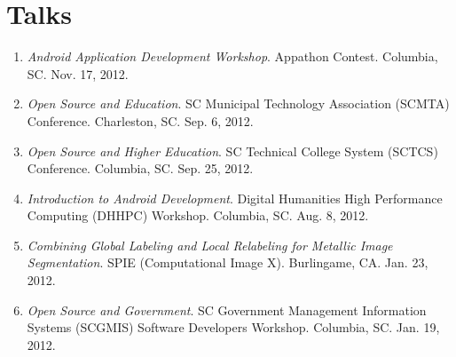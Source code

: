 \documentclass[10pt]{article}
\begin{document}
\nocite{waggoner:13c}
\nocite{waggoner:11}
\nocite{wang:11}
\nocite{temlyakov:10}
\nocite{zhang:10}
\nocite{waggoner:12}
\nocite{barbu:12}
\nocite{zhang:12}

\renewcommand\refname{Selected Publications}
{\footnotesize }


\section{Talks}
{\small
\begin{enumerate}
\renewcommand{\labelenumi}{[P\arabic{enumi}] }
\item \emph{Android Application Development Workshop}.  Appathon
  Contest.  Columbia, SC.  Nov. 17, 2012.
\item \emph{Open Source and Education}. SC Municipal Technology
  Association (SCMTA) Conference. Charleston, SC.  Sep. 6, 2012.
\item \emph{Open Source and Higher Education}.  SC Technical College
  System (SCTCS) Conference.  Columbia, SC.  Sep. 25, 2012.
\item \emph{Introduction to Android Development}.  Digital Humanities
  High Performance Computing (DHHPC) Workshop.  Columbia, SC.  Aug.
  8, 2012.
\item \emph{Combining Global Labeling and Local Relabeling for
  Metallic Image Segmentation}.  SPIE (Computational Image X).
  Burlingame, CA.  Jan. 23, 2012.
\item \emph{Open Source and Government}.  SC Government Management
  Information Systems (SCGMIS) Software Developers Workshop.
  Columbia, SC.  Jan. 19, 2012.
\end{enumerate} }

\end{document}
